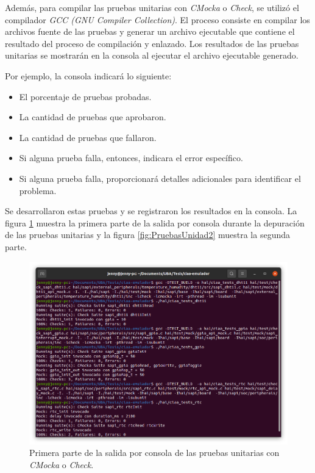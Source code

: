 Además, para compilar las pruebas unitarias con \textit{CMocka} o \textit{Check}, se utilizó el compilador \textit{GCC (GNU Compiler Collection)}. El proceso consiste en compilar los archivos fuente de las pruebas y generar un archivo ejecutable que contiene el resultado del proceso de compilación y enlazado. Los resultados de las pruebas unitarias se mostrarán en la consola al ejecutar el archivo ejecutable generado.

Por ejemplo, la consola indicará lo siguiente:

\begin{itemize}
	\item El porcentaje de pruebas probadas.
	\item La cantidad de pruebas que aprobaron.
	\item La cantidad de pruebas que fallaron.
	\item Si alguna prueba falla, entonces, indicara el error específico.
	\item Si alguna prueba falla, proporcionará detalles adicionales para identificar el problema.
\end{itemize}

Se desarrollaron estas pruebas y se registraron los resultados en la consola. La figura \ref{fig:PruebasUnidad1} muestra la primera parte de la salida por consola durante la depuración de las pruebas unitarias y la figura \ref{fig:PruebasUnidad2} muestra la segunda parte.

\begin{figure}[ht]
	\centering
	\includegraphics[scale=.27]{./Figures/PruebasUnidad1.png}
	\caption{Primera parte de la salida por consola de las pruebas unitarias con \textit{CMocka} o \textit{Check}.}
	\label{fig:PruebasUnidad1}
\end{figure}


